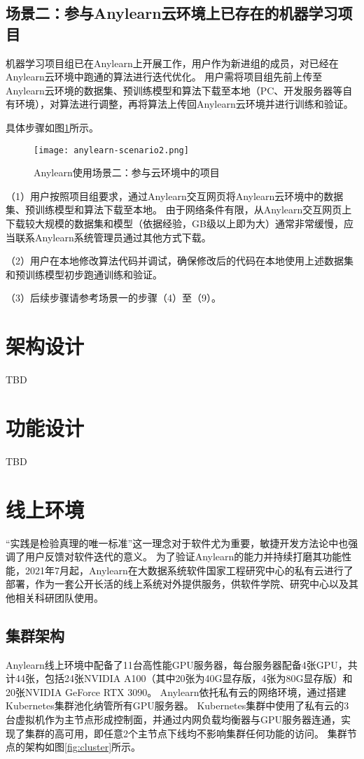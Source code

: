 \subsection{场景二：参与Anylearn云环境上已存在的机器学习项目}

机器学习项目组已在Anylearn上开展工作，用户作为新进组的成员，对已经在Anylearn云环境中跑通的算法进行迭代优化。
用户需将项目组先前上传至Anylearn云环境的数据集、预训练模型和算法下载至本地（PC、开发服务器等自有环境），对算法进行调整，再将算法上传回Anylearn云环境并进行训练和验证。

具体步骤如图\ref{fig:scenario2}所示。

\begin{figure}
  \centering
  \texttt{[image: anylearn-scenario2.png]}
  \caption{Anylearn使用场景二：参与云环境中的项目}
  \label{fig:scenario2}
\end{figure}

（1）用户按照项目组要求，通过Anylearn交互网页将Anylearn云环境中的数据集、预训练模型和算法下载至本地。
由于网络条件有限，从Anylearn交互网页上下载较大规模的数据集和模型（依据经验，GB级以上即为大）通常非常缓慢，应当联系Anylearn系统管理员通过其他方式下载。

（2）用户在本地修改算法代码并调试，确保修改后的代码在本地使用上述数据集和预训练模型初步跑通训练和验证。

（3）后续步骤请参考场景一的步骤（4）至（9）。


\section{架构设计}

TBD


\section{功能设计}

TBD


\section{线上环境}

“实践是检验真理的唯一标准”这一理念对于软件尤为重要，敏捷开发方法论中也强调了用户反馈对软件迭代的意义。
为了验证Anylearn的能力并持续打磨其功能性能，2021年7月起，Anylearn在大数据系统软件国家工程研究中心的私有云进行了部署，作为一套公开长活的线上系统对外提供服务，供软件学院、研究中心以及其他相关科研团队使用。

\subsection{集群架构}
Anylearn线上环境中配备了11台高性能GPU服务器，每台服务器配备4张GPU，共计44张，包括24张NVIDIA A100（其中20张为40G显存版，4张为80G显存版）和20张NVIDIA GeForce RTX 3090。
Anylearn依托私有云的网络环境，通过搭建Kubernetes集群池化纳管所有GPU服务器。
Kubernetes集群中使用了私有云的3台虚拟机作为主节点形成控制面，并通过内网负载均衡器与GPU服务器连通，实现了集群的高可用，即任意2个主节点下线均不影响集群任何功能的访问。
集群节点的架构如图\ref{fig:cluster}所示。


